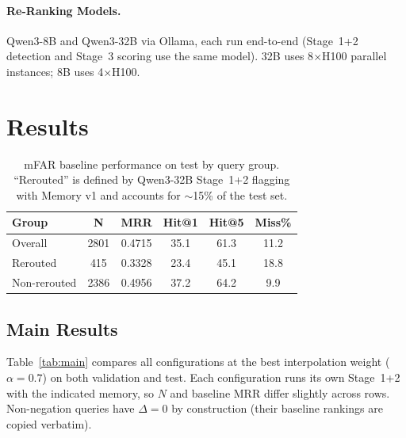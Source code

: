 \documentclass[11pt]{article}
\begin{document}
\paragraph{Re-Ranking Models.} Qwen3-8B and Qwen3-32B via Ollama, each run end-to-end (Stage~1+2 detection and Stage~3 scoring use the same model). 32B uses 8$\times$H100 parallel instances; 8B uses 4$\times$H100.

\section{Results}

\begin{table}[h]
\centering
\caption{mFAR baseline performance on test by query group. ``Rerouted'' is defined by Qwen3-32B Stage~1+2 flagging with Memory v1 and accounts for $\sim$15\% of the test set.}
\label{tab:baseline}
\begin{tabular}{lccccc}
\toprule
\textbf{Group} & \textbf{N} & \textbf{MRR} & \textbf{Hit@1} & \textbf{Hit@5} & \textbf{Miss\%} \\
\midrule
Overall        & 2801 & 0.4715 & 35.1 & 61.3 & 11.2 \\
Rerouted       &  415 & 0.3328 & 23.4 & 45.1 & 18.8 \\
Non-rerouted   & 2386 & 0.4956 & 37.2 & 64.2 &  9.9 \\
\bottomrule
\end{tabular}
\end{table}

\subsection{Main Results}

Table~\ref{tab:main} compares all configurations at the best interpolation weight ($\alpha=0.7$) on both validation and test. Each configuration runs its own Stage~1+2 with the indicated memory, so $N$ and baseline MRR differ slightly across rows. Non-negation queries have $\Delta = 0$ by construction (their baseline rankings are copied verbatim).
\end{document}

